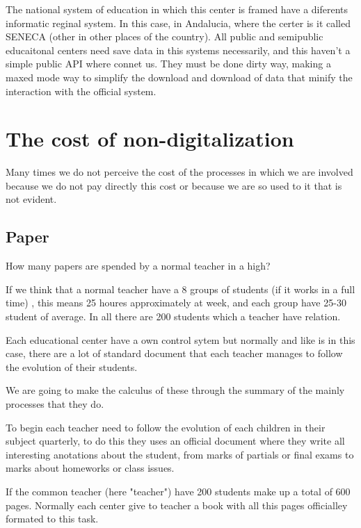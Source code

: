 \documentclass[oneside,english,titlepage]{scrbook}
\begin{document}
\bigskip
{}
\bigskip

The national system of education in which this center is framed have a diferents informatic reginal system. In this case, in Andalucia, where the certer is it called SENECA (other in other places of the country). All public and semipublic educaitonal centers need save data in this systems necessarily, and this haven't a simple public API where connet us. They must be done dirty way, making a maxed mode way to simplify the download and download of data that minify the interaction with the official system.


\section{The cost of non-digitalization}


Many times we do not perceive the cost of the processes in which we are involved because we do not pay directly this cost or because we are so used to it that is not evident. 

\subsection{Paper}

How many papers are spended by a normal teacher in a high?

If we think that a normal teacher have a 8 groups of students (if it works in a full time) ,  this means 25 houres approximately at week, and each group have 25-30 student of average. In all there are 200 students which a teacher have relation. 

Each educational center have a own control sytem but normally and like is in this case, there are a lot of standard document that each teacher manages to follow the evolution of their students.

We are going to make the calculus of  these through the summary of the mainly processes that they do.


To begin each teacher need to follow the evolution of each children in their subject quarterly, to do this they uses an official document where they write all interesting anotations about the student, from marks of partials or final exams to marks about homeworks or class issues.

If the common teacher (here "teacher") have 200 students make up a total of 600 pages. Normally each center give to teacher a book with all this pages officialley formated to this task.
\end{document}
